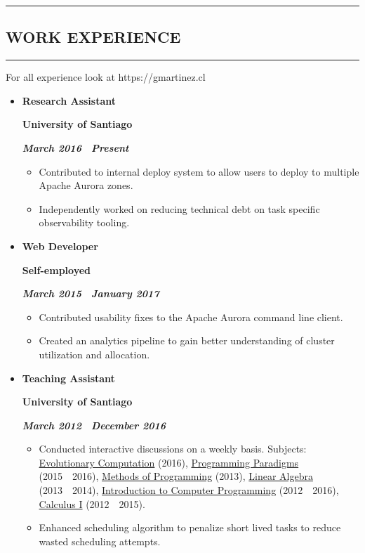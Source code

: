 \documentclass[10pt,letterpaper]{article}
\newcommand{\textbox}[1]{
  \parbox{.333\textwidth}{#1}
}
\newcommand{\sectionTitle}[1]{
  \hrule
  \vspace{-1.0em} 
  \subsection*{\uppercase{\textbf{#1}}}
  \vspace{-0.3em}
    \hrule
    \vspace{0.3em}  
}
\newcommand{\titleExperienceWithoutLocation}[4]{
  \vspace{1.0em}
  \item[]
  {
    \textbox{\textbf{#1}\hfill}\textbox{\hfil \textbf{#2}\hfil}\hfill \textbf{\emph{#3 \textendash \ #4}}
  }
}
\begin{document}
  \vspace{0.30em} 
  
  \sectionTitle{Work Experience}
  \noindent For all experience look at https://gmartinez.cl
  \vspace{-0.9em}
  \begin{itemize}[noitemsep,topsep=0pt]
    \titleExperienceWithoutLocation{Research Assistant}{University of Santiago}{March 2016}{Present}
      \begin{itemize}[label=\textbullet,noitemsep,topsep=0pt]
        \item Contributed to internal deploy system to allow users to deploy to multiple Apache Aurora zones.
        \item Independently worked on reducing technical debt on task specific observability tooling.
      \end{itemize}

    \vspace{-0.4em} 
    \titleExperienceWithoutLocation{Web Developer}{Self-employed}{March 2015}{January 2017}
      \begin{itemize}[label=\textbullet,noitemsep,topsep=0pt]
        \item Contributed usability fixes to the Apache Aurora command line client.
        \item Created an analytics pipeline to gain better understanding of cluster utilization and allocation.
      \end{itemize}
    
    \vspace{-0.4em} 
    \titleExperienceWithoutLocation{Teaching Assistant}{University of Santiago}{March 2012}{December 2016}
      \begin{itemize}[label=\textbullet]
        \itemsep0em
        \item Conducted interactive discussions on a weekly basis. Subjects: \ul{Evolutionary Computation} (2016), \ul{Programming Paradigms} (2015\ \textendash \ 2016), \ul{Methods of Programming} (2013), \ul{Linear Algebra} (2013\ \textendash \ 2014), \ul{Introduction to Computer Programming} (2012\ \textendash \ 2016), \ul{Calculus I} (2012\ \textendash \ 2015).
        \item Enhanced scheduling algorithm to penalize short lived tasks to reduce wasted scheduling attempts.
      \end{itemize}
  \end{itemize}
  \vspace{0.30em} 
  
\end{document}
